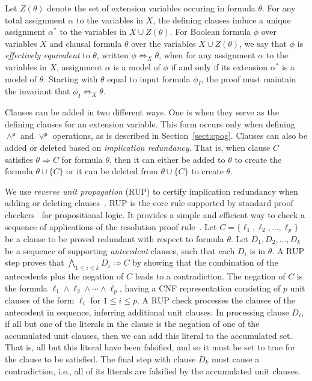 \documentclass[twoside,11pt]{article}
\newcommand{\pand}{\mathbin{\land^\textsf{p}}}
\newcommand{\por}{\mathbin{\lor^\textsf{p}}}
\newcommand{\obar}[1]{\overline{#1}}
\newcommand{\lit}{\ell}
\newcommand{\varset}{X}
\newcommand{\exvarset}{Z}
\newcommand{\imply}{\Rightarrow}
\newcommand{\ifandonlyif}{\Leftrightarrow}
\newcommand{\eequiv}{\ifandonlyif_{\varset}}
\newcommand{\extend}[1]{#1^{*}}
\newcommand{\assign}{\alpha}
\newcommand{\eassign}{\extend{\alpha}}
\newcommand{\inputformula}{\phi_I}
\begin{document}
Let $\exvarset(\theta)$
denote the set of extension variables occuring in formula $\theta$.
For any total assignment $\assign$ to the variables in $\varset$, the defining
clauses induce a unique assignment $\eassign$ to the variables in $\varset
\cup \exvarset(\theta)$.  For Boolean formula $\phi$ over variables
$\varset$ and clausal
formula $\theta$ over the variables $\varset \cup \exvarset(\theta)$, we say that $\phi$ is {\em
  effectively equivalent} to $\theta$, written
$\phi \eequiv \theta$,
when for any assignment
$\assign$ to the variables in $\varset$, assignment $\assign$ is a model of $\phi$ if
and only if its extension $\eassign$ is a model of $\theta$.
Starting with  $\theta$ equal to input formula $\inputformula$,
the proof must maintain the invariant that
$\inputformula \eequiv \theta$.

Clauses can be added in two different ways.  One is when they serve as
the defining clauses for an extension variable.  This form
occurs only when defining $\pand$ and $\por$ operations, as is
described in Section~\ref{sect:cpog}.  Clauses can also be added or
deleted based on \emph{implication redundancy}.  That is, when clause
$C$ satisfies $\theta \imply C$ for formula $\theta$, then it can either
be added to $\theta$ to create the formula $\theta \cup \{C\}$ or it can be deleted
from $\theta \cup \{C\}$ to create $\theta$.

We use \emph{reverse unit propagation} (RUP) to certify
implication redundancy when adding or deleting
clauses~\cite{goldberg,vangelder08_verifying_rup_proofs}.
RUP
is the core rule supported by standard
proof checkers~\cite{heule:cade:2013,wetzler14_drattrim} for propositional logic. It provides a simple and efficient
way to check a sequence of applications of the resolution proof rule~\cite{robinson-1965}.
Let $C = \{\lit_1, \lit_2, \ldots,\lit_p\}$ be a clause to be
proved redundant with respect to formula $\theta$.  Let $D_1, D_2, \ldots, D_k$ be a sequence of supporting
\emph{antecedent} clauses, such that each $D_i$ is in $\theta$.
A RUP step
proves that $\bigwedge_{1\leq i \leq k} D_i \imply C$ by showing
that the combination of the antecedents plus the negation of $C$ leads
to a contradiction.  The negation of $C$ is the formula
$\overline{\lit}_1 \land \overline{\lit}_2 \land \cdots \land
\overline{\lit}_p$, having a CNF representation consisting of $p$ unit
clauses of the form $\obar{\lit}_i$ for $1 \leq i \leq p$.  A RUP
check processes the clauses of the antecedent in sequence, inferring
additional unit clauses.  In processing clause $D_i$, if all but one
of the literals in the clause is the negation of one of the
accumulated unit clauses, then we can add this literal to the
accumulated set.  That is, all but this literal have been falsified,
and so it must be set to true for the clause to be satisfied.  The
final step with clause $D_k$ must cause a contradiction, i.e., all of
its literals are falsified by the accumulated unit clauses.
\end{document}
